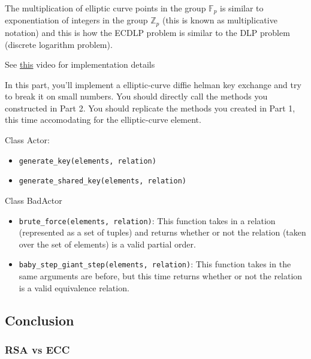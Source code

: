 \documentclass{article}
\begin{document}
The multiplication of elliptic curve points in the group $\mathbb{F}_{p}$ is similar to exponentiation of integers in the group $\mathbb{Z}_{p}$ (this is known as multiplicative notation) and this is how the ECDLP problem is similar to the DLP problem (discrete logarithm problem).

See \href{https://www.youtube.com/watch?v=gAtBM06xwaw}{this} video for implementation details

\begin{tcolorbox}
    In this part, you'll implement a elliptic-curve diffie helman key exchange and try to break it on small numbers. You should directly call the methods you constructed in Part 2. You should replicate the methods you created in Part 1, this time accomodating for the elliptic-curve element.

    Class Actor:
    \begin{itemize}
        \item \lstinline{generate_key(elements, relation)}
        \item \lstinline{generate_shared_key(elements, relation)}
    \end{itemize}

    Class BadActor
    \begin{itemize}
            \item \lstinline{brute_force(elements, relation)}: This function takes in a relation (represented as a set of tuples) and returns whether or not the relation (taken over the set of elements) is a valid partial order.
            \item \lstinline{baby_step_giant_step(elements, relation)}: This function takes in the same arguments are before, but this time returns whether or not the relation is a valid equivalence relation.
        \end{itemize}
\end{tcolorbox}



\subsection*{Conclusion}

    \subsubsection*{RSA vs ECC}
\end{document}
